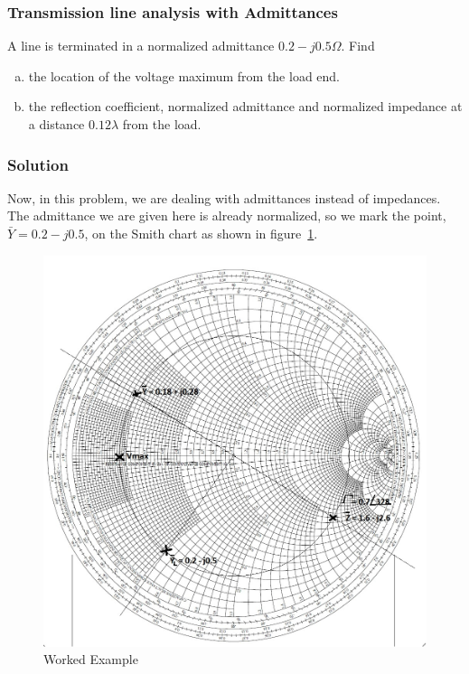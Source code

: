\begin{exmp}
\subsubsection*{Transmission line analysis with Admittances}
A line is terminated in a normalized admittance $0.2-j0.5\varOmega$. Find 
\begin{enumerate}[(a)]
\item the location of the voltage maximum from the load end. 
\item the reflection coefficient, normalized admittance and normalized impedance at a distance $0.12\lambda$ from the load.
\end{enumerate}

\subsubsection*{Solution}
Now, in this problem, we are dealing with admittances instead of impedances. The admittance we are given here is already normalized, so we mark the point, $\bar{Y} = 0.2 - j0.5$, on the Smith chart as shown in figure~\ref{fig:workedexample3}.
\begin{figure}[h]
\centering
\includegraphics[width=1\linewidth]{"./graphics/smith chart 3"}
\caption{Worked Example}
\label{fig:workedexample3}
\end{figure}


\end{exmp}
